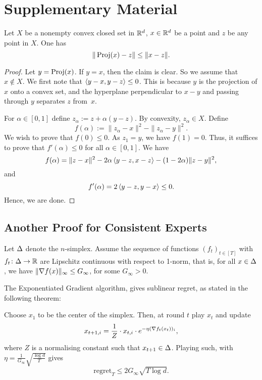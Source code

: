 \chapter{Supplementary Material}
\begin{lemma}\label{lem:projection}
    Let $X$ be a nonempty convex closed set in $\mathbb{R}^d$, $x\in \mathbb{R}^d$ be a point and $z$ be any point in $X$. One has
    \[
        \| \operatorname{Proj}(x) - z \| \leq \|x - z\|.
    \]
\end{lemma}
\begin{proof}
    Let $y = \operatorname{Proj}(x)$. If $y=x$, then the claim is clear. So we assume that $x\not\in X$. We first note that $\left\langle y-x,y-z \right\rangle \leq 0$. This is because $y$ is the projection of $x$ onto a convex set, and the hyperplane perpendicular to $x-y$ and passing through $y$ separates $z$ from~$x$.

    For $\alpha \in [0,1]$ define $z_\alpha := z + \alpha(y-z)$. By convexity, $z_\alpha \in X$. Define
    \[
        f(\alpha) := \|z_\alpha - x\|^2 - \|z_\alpha - y\|^2. 
    \]
    We wish to prove that $f(0) \leq 0$.  As $z_1 = y$, we have $f(1) = 0$. Thus, it suffices to prove that $f'(\alpha) \leq 0$ for all $\alpha\in[0,1]$. We have
    \[
        f(\alpha) = \|z-x\|^2 - 2\alpha\left\langle y-z,x-z \right\rangle - (1-2\alpha)\|z-y\|^2,
    \]
    and
    \[
        f'(\alpha) = 2\left\langle y-z,y-x \right\rangle \leq 0.
    \]
    Hence, we are done.
\end{proof}

\section{Another Proof for Consistent Experts}
Let $\Delta$ denote the $n$-simplex. Assume the sequence of functions $(f_t)_{t\in[T]}$ with $f_t\colon\Delta\to \mathbb{R}$ are Lipschitz continuous with respect to 1-norm, that is, for all $x\in\Delta$, we have $\|\nabla f(x)\|_\infty \leq G_\infty$, for some $G_\infty>0$.

The Exponentiated Gradient algorithm, gives sublinear regret, as stated in the following theorem:
\begin{theorem}
    Choose $x_1$ to be the center of the simplex. Then, at round $t$ play $x_t$ and update
    \[
        x_{t+1, i} = \frac{1}{Z}\cdot x_{t,i} \cdot e^{-\eta (\nabla f_t(x_t))_i},
    \]
    where $Z$ is a normalising constant such that $x_{t+1}\in \Delta$. Playing such, with $\eta = \frac{1}{G_\infty} \sqrt{\frac{\log d}{T}}$ gives
    \[
        \mathrm{regret}_T \leq 2G_\infty \sqrt{T \log d}.
    \]
\end{theorem}

